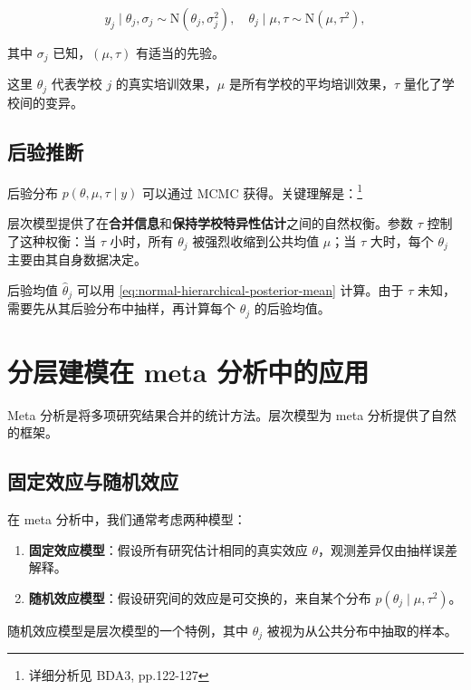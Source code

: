 \[
y_j \mid \theta_j, \sigma_j \sim \mathrm{N}(\theta_j, \sigma_j^2), \quad \theta_j \mid \mu, \tau \sim \mathrm{N}(\mu, \tau^2), \label{eq:sat-model}
\]

其中 $\sigma_j$ 已知，$(\mu, \tau)$ 有适当的先验。

这里 $\theta_j$ 代表学校 $j$ 的真实培训效果，$\mu$ 是所有学校的平均培训效果，$\tau$ 量化了学校间的变异。

\subsection{后验推断}\label{sec:sat-posterior}

后验分布 $p(\theta, \mu, \tau \mid y)$ 可以通过 MCMC 获得。关键理解是：\footnote{详细分析见 BDA3, pp.122-127}

\begin{Remark}
  层次模型提供了在\textbf{合并信息}和\textbf{保持学校特异性估计}之间的自然权衡。参数 $\tau$ 控制了这种权衡：当 $\tau$ 小时，所有 $\theta_j$ 被强烈收缩到公共均值 $\mu$；当 $\tau$ 大时，每个 $\theta_j$ 主要由其自身数据决定。
\end{Remark}

后验均值 $\hat{\theta}_j$ 可以用 \eqref{eq:normal-hierarchical-posterior-mean} 计算。由于 $\tau$ 未知，需要先从其后验分布中抽样，再计算每个 $\theta_j$ 的后验均值。

\section{分层建模在 meta 分析中的应用}

Meta 分析是将多项研究结果合并的统计方法。层次模型为 meta 分析提供了自然的框架。

\subsection{固定效应与随机效应}

在 meta 分析中，我们通常考虑两种模型：

\begin{enumerate}
  \item \textbf{固定效应模型}：假设所有研究估计相同的真实效应 $\theta$，观测差异仅由抽样误差解释。
  \item \textbf{随机效应模型}：假设研究间的效应是可交换的，来自某个分布 $p(\theta_j \mid \mu, \tau^2)$。
\end{enumerate}

随机效应模型是层次模型的一个特例，其中 $\theta_j$ 被视为从公共分布中抽取的样本。

